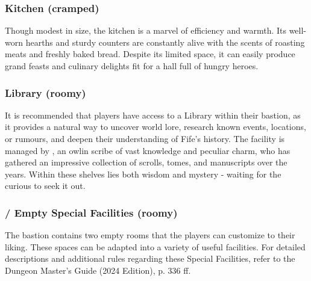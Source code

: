 \subsubsection*{ Kitchen (cramped)}
{\entryfont Though modest in size, the kitchen is a marvel of efficiency and warmth. Its well-worn hearths and sturdy counters are constantly alive with the scents of roasting meats and freshly baked bread. Despite its limited space, it can easily produce grand feasts and culinary delights fit for a hall full of hungry heroes.}
\subsubsection*{ Library (roomy)}
{\entryfont It is recommended that players have access to a Library within their bastion, as it provides a natural way to uncover world lore, research known events, locations, or rumours, and deepen their understanding of Fife's history. The facility is managed by \hyperref[cha:OwlHooters]{}, an owlin scribe of vast knowledge and peculiar charm, who has gathered an impressive collection of scrolls, tomes, and manuscripts over the years. Within these shelves lies both wisdom and mystery - waiting for the curious to seek it out.}
\subsubsection*{/ Empty Special Facilities (roomy)}
{\entryfont The bastion contains two empty rooms that the players can customize to their liking. These spaces can be adapted into a variety of useful facilities. For detailed descriptions and additional rules regarding these Special Facilities, refer to the Dungeon Master's Guide (2024 Edition), p. 336 ff.}%